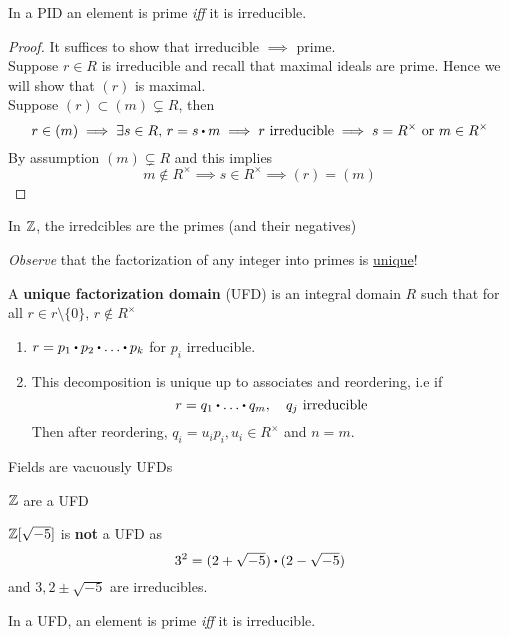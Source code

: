 \documentclass[../Main.tex]{subfiles}
\begin{document}
\begin{prop}[title = Element in PID is prime iff it is irreducible]
	In a PID an element is prime \textit{iff} it is irreducible.
\end{prop}
\begin{proof}
	It suffices to show that irreducible $\implies$ prime.\\
	Suppose $r\in R$ is irreducible and recall that maximal ideals are prime. Hence we will show that $(r)$ is maximal.\\
	Suppose $(r)\subset (m)\subsetneq R$, then
	\[r\in (m) \implies \exists s\in R,\, r=s\rdot m\implies r \text{ irreducible} \implies s=R^\times \text{ or } m\in R^\times\]
	By assumption $(m)\subsetneq R$ and this implies
	\[m\notin R^\times \implies s\in R^\times \implies (r) = (m)\]
\end{proof}
\begin{example}
	In $\mathbb{Z}$, the irredcibles are the primes (and their negatives)
\end{example}
\textit{Observe} that the factorization of any integer into primes is \underline{unique}!
\begin{dfn}[title = Unique Factorization Domain]
	A \textbf{unique factorization domain} (UFD) is an integral domain $R$ such that for all $r\in r\setminus \{0\},\, r\notin R^\times$
	\begin{enumerate}
		\item $r=p_1\rdot p_2\rdot \dots\rdot p_k$ for $p_i$ irreducible.
		\item This decomposition is unique up to associates and reordering, i.e if 
		\[r=q_1\rdot \dots \rdot q_m,\quad q_j \text{ irreducible}\]
		Then after reordering, $q_i=u_ip_i, u_i\in R^\times$ and $n=m$.
	\end{enumerate}
\end{dfn}
\begin{example}
	Fields are vacuously UFDs
\end{example}
\begin{example}
	$\mathbb{Z}$ are a UFD
\end{example}
\begin{example}
	$\mathbb{Z}[\sqrt{-5}]$ is \textbf{not} a UFD as
	\[3^2=(2+\sqrt{-5})\rdot (2-\sqrt{-5})\]
	and $3,2\pm \sqrt{-5}$ are irreducibles.
\end{example}
\begin{prop}[title = Element in UFD is prime iff it is irreducible]
	In a UFD, an element is prime \textit{iff} it is irreducible.
\end{prop}
\end{document}
